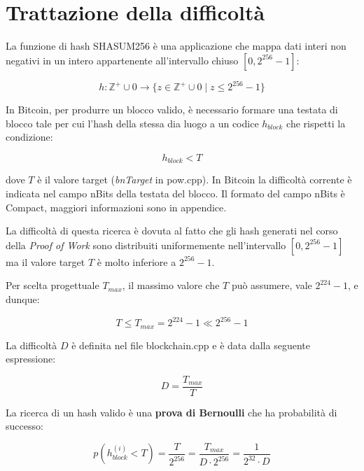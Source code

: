 \documentclass{book}
\theoremstyle{definition}
\begin{document}
\section{Trattazione della difficoltà}

La funzione di hash SHASUM256 è una applicazione che mappa dati interi non negativi in un intero appartenente all'intervallo chiuso $ \left [0, 2^{256} - 1 \right ]$:

\begin{equation}
    h: \mathbb{Z}^{+} \cup {0} \rightarrow \{ z \in \mathbb{Z}^{+} \cup {0} \mid z  \leq 2^{256} - 1 \} \label{applicazione_hash}
\end{equation}

In Bitcoin, per produrre un blocco valido, è necessario formare una testata di blocco tale per cui l'hash della stessa dia luogo a un codice $h_{block}$ che rispetti la condizione:

\begin{equation}
    h_{block} < T \label{condizione_hash}
\end{equation}

dove $T$ è il valore target (\textit{bnTarget} in pow.cpp). In Bitcoin la difficoltà corrente è indicata nel campo nBits della testata del blocco.
Il formato del campo nBits è Compact, maggiori informazioni sono in appendice.

La difficoltà di questa ricerca è dovuta al fatto che gli hash generati nel corso della \textit{Proof of Work} sono distribuiti uniformemente nell'intervallo $ \left [0, 2^{256} - 1 \right ]$ ma il valore target $T$ è molto inferiore a $2^{256} - 1$. 

Per scelta progettuale $T_{max}$, il massimo valore che $T$ può assumere, vale $2^{224} - 1$, e dunque:

\begin{equation}
    T \le T_{max} = 2^{224} - 1 \ll 2^{256} - 1 \label{target_value}
\end{equation}

La difficoltà $D$ è definita nel file blockchain.cpp e è data dalla seguente espressione:

\begin{equation}
    D = \frac{T_{max}}{T} \label{diff}
\end{equation}

La ricerca di un hash valido è una \textbf{prova di Bernoulli} che ha probabilità di successo:

\begin{equation}
    \label{eq:pbloc}
    p(h_{block}^{(i)} < T) = \frac{T}{2^{256}} =\frac{T_{max}}{D \cdot 2^{256}} = \frac{1}{2^{32} \cdot D}
\end{equation}
\end{document}
